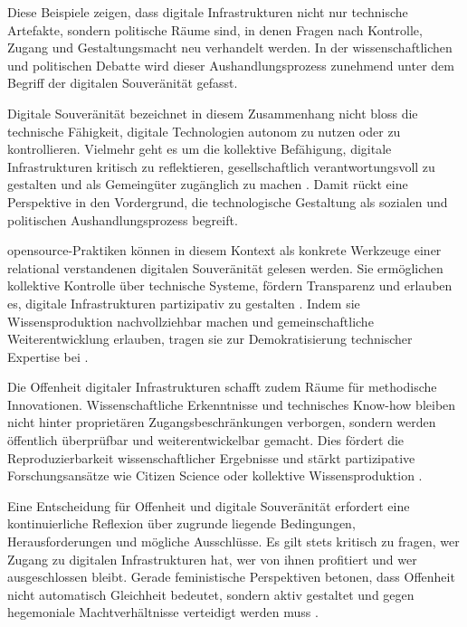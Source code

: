 Diese Beispiele zeigen, dass digitale Infrastrukturen nicht nur technische Artefakte, sondern politische Räume sind, in denen Fragen nach Kontrolle, Zugang und Gestaltungsmacht neu verhandelt werden. In der wissenschaftlichen und politischen Debatte wird dieser Aushandlungsprozess zunehmend unter dem Begriff der digitalen Souveränität gefasst.

Digitale Souveränität bezeichnet in diesem Zusammenhang nicht bloss die technische Fähigkeit, digitale Technologien autonom zu nutzen oder zu kontrollieren. Vielmehr geht es um die kollektive Befähigung, digitale Infrastrukturen kritisch zu reflektieren, gesellschaftlich verantwortungsvoll zu gestalten und als Gemeingüter zugänglich zu machen \parencite{baackDataficationEmpowermentHow2015, glaszeContestedSpatialitiesDigital2023}. Damit rückt eine Perspektive in den Vordergrund, die technologische Gestaltung als sozialen und politischen Aushandlungsprozess begreift.

\gls{opensource}-Praktiken können in diesem Kontext als konkrete Werkzeuge einer relational verstandenen digitalen Souveränität gelesen werden. Sie ermöglichen kollektive Kontrolle über technische Systeme, fördern Transparenz und erlauben es, digitale Infrastrukturen partizipativ zu gestalten \parencite{gurumurthyDataBodiesNew2022}. Indem sie Wissensproduktion nachvollziehbar machen und gemeinschaftliche Weiterentwicklung erlauben, tragen sie zur Demokratisierung technischer Expertise bei \parencite{baackDataficationEmpowermentHow2015, pohleDigitalSovereignty2020}.

Die Offenheit digitaler Infrastrukturen schafft zudem Räume für methodische Innovationen. Wissenschaftliche Erkenntnisse und technisches Know-how bleiben nicht hinter proprietären Zugangsbeschränkungen verborgen, sondern werden öffentlich überprüfbar und weiterentwickelbar gemacht. Dies fördert die Reproduzierbarkeit wissenschaftlicher Ergebnisse und stärkt partizipative Forschungsansätze wie Citizen Science oder kollektive Wissensproduktion \parencite{fecherWhatDrivesAcademic2014}.

Eine Entscheidung für Offenheit und digitale Souveränität erfordert eine kontinuierliche Reflexion über zugrunde liegende Bedingungen, Herausforderungen und mögliche Ausschlüsse. Es gilt stets kritisch zu fragen, wer Zugang zu digitalen Infrastrukturen hat, wer von ihnen profitiert und wer ausgeschlossen bleibt. Gerade feministische Perspektiven betonen, dass Offenheit nicht automatisch Gleichheit bedeutet, sondern aktiv gestaltet und gegen hegemoniale Machtverhältnisse verteidigt werden muss \parencite{wilshireTimeRebootFeminism2024}.
